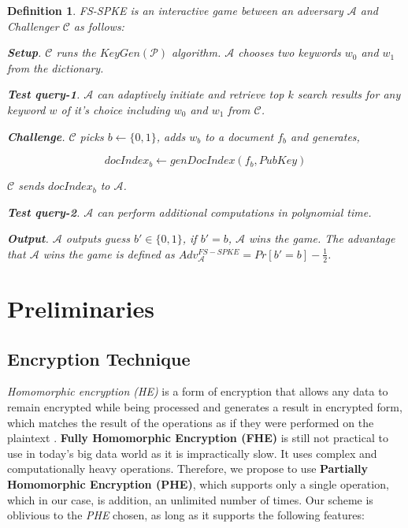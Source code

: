\documentclass[sigconf,pdftex]{acmart}
\newtheorem{definition}{Definition}[]
\begin{document}
\begin{definition}\label{fs-game}
 FS-SPKE is an interactive game between an adversary $\mathcal{A}$ and Challenger $\mathcal{C}$ as follows:

\textbf{\textit{Setup}}. $\mathcal{C}$ runs the $KeyGen(\mathcal{P})$ algorithm. $\mathcal{A}$ chooses two keywords $w_0$ and $w_1$ from the dictionary.

\textbf{\textit{Test query-1}}. $\mathcal{A}$ can adaptively initiate and retrieve top $k$ search results for any keyword $w$ of it's choice including $w_0$ and $w_1$ from $\mathcal{C}$.

\textbf{\textit{Challenge}}. $\mathcal{C}$ picks $b\leftarrow\{0,1\}$, adds $w_b$ to a document $f_b$ and generates,

\begin{equation}
docIndex_b\leftarrow genDocIndex(f_b, PubKey)
\end{equation}

$\mathcal{C}$ sends $docIndex_b$ to $\mathcal{A}$.


\textbf{\textit{Test query-2}}. $\mathcal{A}$ can perform additional computations in polynomial time.



\textbf{\textit{Output}}. $\mathcal{A}$ outputs guess $b'\in \{0,1\}$, if $b' = b$, $\mathcal{A}$ wins the game. The advantage that $\mathcal{A}$ wins the game is defined as $Adv_{\mathcal{A}}^{FS-SPKE}= Pr[b' = b]-\frac{1}{2}$.


\end{definition}







\section{Preliminaries}\label{preli}

\subsection{Encryption Technique} \label{encryp_tech}



\textit{Homomorphic encryption (HE)} is a form of encryption that allows any data to remain encrypted while being processed and generates a result in encrypted form, which matches the result of the operations as if they were performed on the plaintext \cite{rivest1978data, acar2018survey}. \textbf{Fully Homomorphic Encryption (FHE)} is still not practical to use in today's big data world as it is impractically slow. It uses complex and computationally heavy operations. Therefore, we propose to use \textbf{Partially Homomorphic Encryption (PHE)}, which supports only a single operation, which in our case, is addition, an unlimited number of times. Our scheme is oblivious to the \textit{PHE} chosen, as long as it supports the following features:
\end{document}
